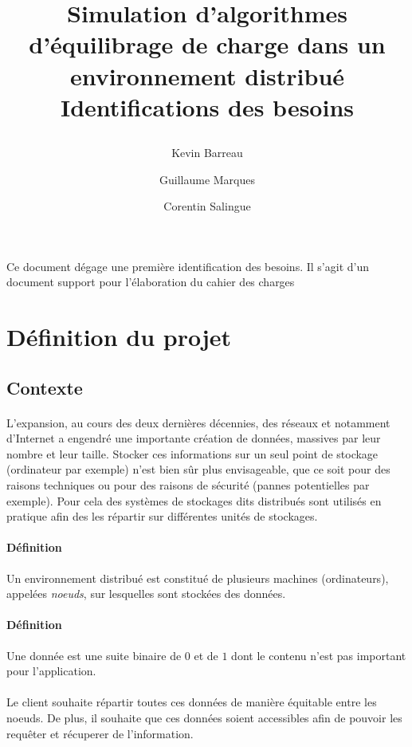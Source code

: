 \documentclass[12pt]{article}
\title{
 \begin{minipage}\linewidth
        \centering
        Simulation d'algorithmes d'équilibrage de charge dans un environnement distribué 
        \vskip3pt
        \large Identifications des besoins
    \end{minipage}
 }
\author{Kevin Barreau \and Guillaume Marques \and Corentin Salingue}
\begin{document}
\maketitle

\abstract
Ce document dégage une première identification des besoins.
Il s'agit d'un document support pour l'élaboration du cahier des charges

\newpage

\renewcommand{\contentsname}{Sommaire} 

\tableofcontents

\newpage

\section{Définition du projet}

\subsection{Contexte}

\paragraph{}
L'expansion, au cours des deux dernières décennies, des réseaux et notamment d'Internet a engendré une importante création de données, massives par leur nombre et leur taille.
Stocker ces informations sur un seul point de stockage (ordinateur par exemple) n'est bien sûr plus envisageable, que ce soit pour des raisons techniques ou pour des raisons de sécurité (pannes potentielles par exemple).
Pour cela des systèmes de stockages dits distribués sont utilisés en pratique afin des les répartir sur différentes unités de stockages.

\paragraph{Définition} Un environnement distribué est constitué de plusieurs machines (ordinateurs), appelées \textit{noeuds}, sur lesquelles sont stockées des données.

\paragraph{Définition} Une donnée est une suite binaire de $0$ et de $1$ dont le contenu n'est pas important pour l'application.

\paragraph{} Le client souhaite répartir toutes ces données de manière équitable entre les noeuds. De plus, il souhaite que ces données soient accessibles afin de pouvoir les requêter et récuperer de l'information.
\end{document}
